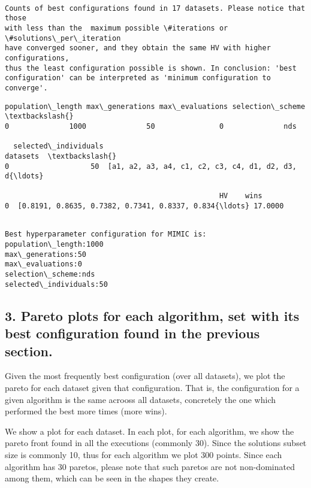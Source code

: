 \documentclass[11pt]{article}
\begin{document}
    
    \begin{Verbatim}[commandchars=\\\{\}]

Counts of best configurations found in 17 datasets. Please notice that those
with less than the  maximum possible \#iterations or \#solutions\_per\_iteration
have converged sooner, and they obtain the same HV with higher configurations,
thus the least configuration possible is shown. In conclusion: 'best
configuration' can be interpreted as 'minimum configuration to converge'.
    \end{Verbatim}

    
    \begin{Verbatim}[commandchars=\\\{\}]
  population\_length max\_generations max\_evaluations selection\_scheme  \textbackslash{}
0              1000              50               0              nds   

  selected\_individuals                                           datasets  \textbackslash{}
0                   50  [a1, a2, a3, a4, c1, c2, c3, c4, d1, d2, d3, d{\ldots}   

                                                  HV    wins  
0  [0.8191, 0.8635, 0.7382, 0.7341, 0.8337, 0.834{\ldots} 17.0000  
    \end{Verbatim}

    
    \begin{Verbatim}[commandchars=\\\{\}]

Best hyperparameter configuration for MIMIC is:
population\_length:1000
max\_generations:50
max\_evaluations:0
selection\_scheme:nds
selected\_individuals:50
    \end{Verbatim}

    \subsection{3. Pareto plots for each algorithm, set with its best
configuration found in the previous
section.}\label{pareto-plots-for-each-algorithm-set-with-its-best-configuration-found-in-the-previous-section.}

Given the most frequently best configuration (over all datasets), we
plot the pareto for each dataset given that configuration. That is, the
configuration for a given algorithm is the same acrooss all datasets,
concretely the one which performed the best more times (more wins).

We show a plot for each dataset. In each plot, for each algorithm, we
show the pareto front found in all the executions (commonly 30). Since
the solutions subset size is commonly 10, thus for each algorithm we
plot 300 points. Since each algorithm has 30 paretos, please note that
such paretos are not non-dominated among them, which can be seen in the
shapes they create.
\end{document}
